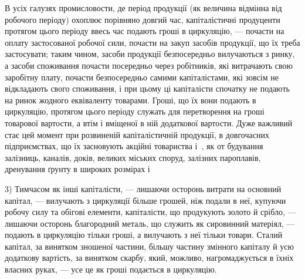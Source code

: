 В усіх галузях промисловости, де період продукції (як величина
відмінна від робочого періоду) охоплює порівняно довгий час, капіталістичні
продуценти протягом цього періоду ввесь час подають гроші в циркуляцію,
— почасти на оплату застосованої робочої сили, почасти на закуп
засобів продукції, що їх треба застосувати; таким чином, засоби продукції
безпосередньо вилучаються з ринку, а засоби споживання почасти посередньо
через робітників, які витрачають свою заробітну плату, почасти
безпосередньо самими капіталістами, які зовсім не відкладають свого
споживання, і при цьому ці капіталісти спочатку не подають на ринок
жодного еквіваленту товарами. Гроші, що їх вони подають в циркуляцію,
протягом цього періоду служать для перетворення на гроші товарової
вартости, а втім і вміщеної в ній додаткової вартости. Дуже важливий
стає цей момент при розвиненій капіталістичній продукції, в довгочасних
підприємствах, що їх засновують акційні товариства і~, як
от будування залізниць, каналів, доків, великих міських споруд, залізних
пароплавів, дренування ґрунту в широких розмірах і~

3) Тимчасом як інші капіталісти, — лишаючи осторонь витрати на
основний капітал, — вилучають з циркуляції більше грошей, ніж подали в
неї, купуючи робочу силу та обігові елементи, капіталісти, що продукують
золото й срібло, — лишаючи осторонь благородний металь, що служить як
сировинний матеріял, — подають в циркуляцію тільки гроші, а вилучають
з неї тільки товари. Сталий капітал, за винятком зношеної частини,
більшу частину змінного капіталу й усю додаткову вартість, за винятком
скарбу, який, можливо, нагромаджується в їхніх власних руках, — усе це
як гроші подається в циркуляцію.
